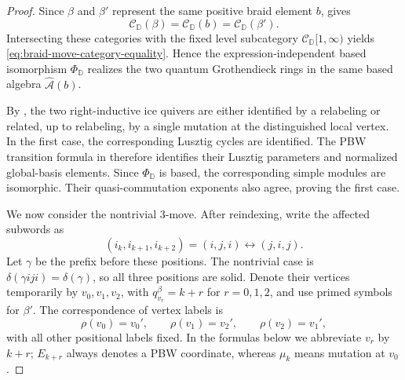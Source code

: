 \documentclass[12pt, reqno]{amsart}
\theoremstyle{plain}
\theoremstyle{definition}
\numberwithin{equation}{section}
\newcommand{\DD}{\mathbb{D}}
\newcommand{\cA}{\mathcal{A}}
\begin{document}
\begin{proof}
Since \(\beta\) and \(\beta'\) represent the same positive braid
element \(b\), \cite[Corollary~5.34]{kashiwara2025monoidal} gives
\[
    \mathscr C_{\DD}(\beta)
    =
    \mathscr C_{\DD}(b)
    =
    \mathscr C_{\DD}(\beta').
\]
Intersecting these categories with the fixed level subcategory
\(\mathscr C_{\DD}[1,\infty)\) yields
\eqref{eq:braid-move-category-equality}. Hence the
expression-independent based isomorphism \(\Phi_{\DD}\) realizes the
two quantum Grothendieck rings in the same based algebra
\(\widehat{\cA}(b)\).

By \cite[Proposition~4.46 and Figures~9--10]{casals2025cluster}, the
two right-inductive ice quivers are either identified by a relabeling
or related, up to relabeling, by a single mutation at the
distinguished local vertex. In the first case, the corresponding
Lusztig cycles are identified. The PBW transition formula in
\cite[Theorem~4.12]{bi2026towards} therefore identifies their
Lusztig parameters and normalized global-basis elements. Since
\(\Phi_{\DD}\) is based, the corresponding simple modules are
isomorphic. Their quasi-commutation exponents also agree, proving the
first case.

We now consider the nontrivial \(3\)-move. After reindexing, write
the affected subwords as
\[
    (i_k,i_{k+1},i_{k+2})
    =
    (i,j,i)
    \longleftrightarrow
    (j,i,j).
\]
Let \(\gamma\) be the prefix before these positions. The nontrivial
case is \(\delta(\gamma iji)=\delta(\gamma)\), so all three
positions are solid. Denote their vertices temporarily by
\(v_0,v_1,v_2\), with
\(q_{v_r}^{\beta}=k+r\) for \(r=0,1,2\), and use primed symbols
for \(\beta'\). The correspondence of vertex labels is
\begin{equation}\label{eq:braid-move-vertex-labels}
    \rho(v_0)=v_0',\qquad
    \rho(v_1)=v_2',\qquad
    \rho(v_2)=v_1',
\end{equation}
with all other positional labels fixed. In the formulas below we
abbreviate \(v_r\) by \(k+r\); \(E_{k+r}\) always denotes a
PBW coordinate, whereas \(\mu_k\) means mutation at \(v_0\).


\end{proof}
\end{document}
